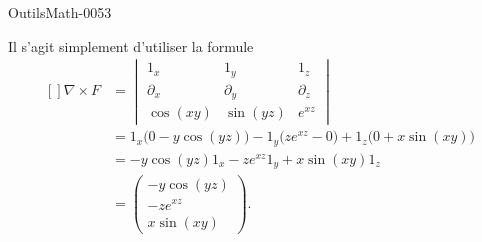 
\begin{corrige}{OutilsMath-0053}

    Il s'agit simplement d'utiliser la formule
    \begin{equation}
        \begin{aligned}[]
            \nabla\times F&=\begin{vmatrix}
                 1_x   &   1_y    &   1_z    \\
                \partial_x    &   \partial_y    &   \partial_z    \\
                \cos(xy)    &   \sin(yz)    &    e^{xz}
            \end{vmatrix}\\
            &=
            1_x\big( 0-y\cos(yz) \big)-1_y\big( z e^{xz}-0 \big)+1_z\big( 0+x\sin(xy) \big)\\
            &=-y\cos(yz)1_x-z e^{xz}1_y+x\sin(xy)1_z\\
            &=\begin{pmatrix}
                -y\cos(yz)    \\ 
                -z e^{xz}    \\ 
                x\sin(xy)    
            \end{pmatrix}.
        \end{aligned}
    \end{equation}

\end{corrige}
